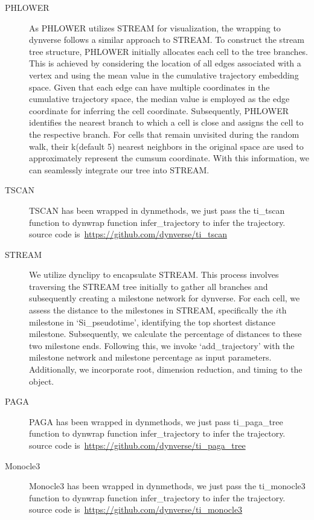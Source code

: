 \begin{description}
	\item[PHLOWER] As PHLOWER utilizes STREAM for visualization, the wrapping to dynverse follows a similar approach to STREAM. To construct the stream tree structure, PHLOWER initially allocates each cell to the tree branches. This is achieved by considering the location of all edges associated with a vertex and using the mean value in the cumulative trajectory embedding space. Given that each edge can have multiple coordinates in the cumulative trajectory space, the median value is employed as the edge coordinate for inferring the cell coordinate. Subsequently, PHLOWER identifies the nearest branch to which a cell is close and assigns the cell to the respective branch. For cells that remain unvisited during the random walk, their k(default 5) nearest neighbors in the original space are used to approximately represent the cumsum coordinate. With this information, we can seamlessly integrate our tree into STREAM.

	\item[TSCAN]
	TSCAN has been wrapped in dynmethods, we just pass the ti\_tscan function to dynwrap function infer\_trajectory to infer the trajectory. source code is~\url{https://github.com/dynverse/ti\_tscan}

	\item[STREAM] We utilize dynclipy to encapsulate STREAM. This process involves traversing the STREAM tree initially to gather all branches and subsequently creating a milestone network for dynverse. For each cell, we assess the distance to the milestones in STREAM, specifically the $i$th milestone in `Si\_pseudotime', identifying the top shortest distance milestone. Subsequently, we calculate the percentage of distances to these two milestone ends. Following this, we invoke `add\_trajectory' with the milestone network and milestone percentage as input parameters. Additionally, we incorporate root, dimension reduction, and timing to the object.

	\item[PAGA]
	PAGA has been wrapped in dynmethods, we just pass ti\_paga\_tree function to dynwrap function infer\_trajectory to infer the trajectory. source code is~\url{https://github.com/dynverse/ti\_paga\_tree}

	\item[Monocle3]
	Monocle3 has been wrapped in dynmethods, we just pass the ti\_monocle3 function to dynwrap function infer\_trajectory to infer the trajectory. source code is~\url{https://github.com/dynverse/ti\_monocle3}


\end{description}
